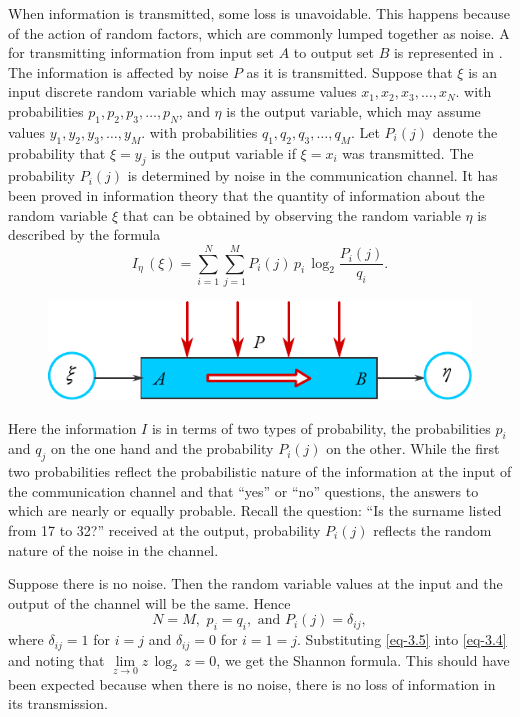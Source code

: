  When information is transmitted, some loss is unavoidable. This happens because of the action of random factors, which are commonly lumped together as noise. A  for transmitting information from input set $A$ to output set $B$ is represented in . The information is affected by noise $P$ as it is transmitted. Suppose that $\xi$ is an input discrete random variable which may assume values $x_{1}, x_{2}, x_{3},\ldots{} , x_{N}$. with probabilities  $p_{1}, p_{2}, p_{3},\ldots{} , p_{N}$, and $\eta$ is the output variable, which may assume values $y_{1}, y_{2}, y_{3},\ldots , y_{M}$. with probabilities  $q_{1}, q_{2}, q_{3},\ldots{} , q_{M}$. Let $P_{i}(j)$ denote the probability that $\xi = y_{j}$ is the output variable if $\xi = x_{i}$ was transmitted. The probability $P_{i}(j)$ is determined by noise in the communication channel. It has been proved in information theory that the quantity of information about the random variable $\xi$ that can be obtained by observing the random variable $\eta$ is described by the formula
\begin{equation}%
I_{\eta} \, (\xi) = \sum_{i=1}^{N}\sum_{j=1}^{M} P_{i}(j) \, p_{i}  \, \log_{2} \frac{P_{i}(j)}{q_{i}}.
\label{eq-3.4}
\end{equation}
\begin{figure}[!ht]
 \centering
 \includegraphics[width=0.8\linewidth]{figures/comm-channel.pdf}
\end{figure}
Here the information $I$ is in terms of two types of probability, the
probabilities $p_{i}$ and $q_{j}$ on the one hand and the probability $P_{i}(j)$ on the other. While the first two probabilities reflect the probabilistic nature of
the information at the input of the communication channel and that
``yes'' or ``no'' questions, the answers to which are nearly or equally
probable. Recall the question: ``Is the surname listed from 17 to 32?''
received at the output, probability $P_{i}(j)$ reflects the random nature of
the noise in the channel.

Suppose there is no noise. Then the random variable values at the
input and the output of the channel will be the same. Hence
\begin{equation}%
N = M, \,\, p_{i}= q_{i}, \,\, \text{and} \,\, P_{i}(j) = \delta_{ij},
\label{eq-3.5}
\end{equation}
where $\delta_{ij}=1$ for $i = j$ and $\delta_{ij} = 0$ for $i =1= j$.
Substituting \eqref{eq-3.5} into \eqref{eq-3.4} and noting that $\lim\limits_{z \to 0} z \, \log_{2} \, z = 0$, we get the Shannon formula. This should have been expected because when there is no noise, there is no loss of information in its transmission.


